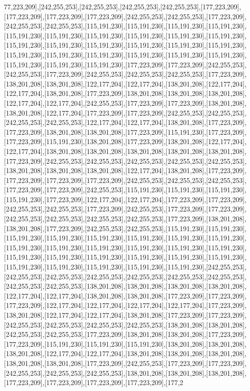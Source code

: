 77,223,209],[242,255,253],[242,255,253],[242,255,253],[242,255,253],[177,223,209],[177,223,209],[177,223,209],[177,223,209],[242,255,253],[242,255,253],[177,223,209],[242,255,253],[242,255,253],[115,191,230],[115,191,230],[115,191,230],[115,191,230],[115,191,230],[115,191,230],[115,191,230],[115,191,230],[115,191,230],[115,191,230],[115,191,230],[115,191,230],[115,191,230],[115,191,230],[115,191,230],[115,191,230],[115,191,230],[115,191,230],[115,191,230],[115,191,230],[115,191,230],[115,191,230],[115,191,230],[115,191,230],[115,191,230],[177,223,209],[177,223,209],[242,255,253],[242,255,253],[177,223,209],[242,255,253],[242,255,253],[242,255,253],[177,223,209],[138,201,208],[138,201,208],[122,177,204],[122,177,204],[138,201,208],[122,177,204],[122,177,204],[138,201,208],[177,223,209],[138,201,208],[138,201,208],[138,201,208],[122,177,204],[122,177,204],[242,255,253],[177,223,209],[177,223,209],[138,201,208],[138,201,208],[122,177,204],[177,223,209],[177,223,209],[242,255,253],[242,255,253],[242,255,253],[242,255,253],[122,177,204],[122,177,204],[138,201,208],[177,223,209],[177,223,209],[138,201,208],[138,201,208],[177,223,209],[115,191,230],[177,223,209],[177,223,209],[115,191,230],[138,201,208],[177,223,209],[138,201,208],[122,177,204],[122,177,204],[138,201,208],[138,201,208],[138,201,208],[138,201,208],[138,201,208],[177,223,209],[242,255,253],[242,255,253],[242,255,253],[242,255,253],[242,255,253],[138,201,208],[138,201,208],[138,201,208],[122,177,204],[138,201,208],[177,223,209],[177,223,209],[177,223,209],[177,223,209],[242,255,253],[242,255,253],[242,255,253],[177,223,209],[177,223,209],[242,255,253],[115,191,230],[115,191,230],[115,191,230],[115,191,230],[177,223,209],[122,177,204],[122,177,204],[177,223,209],[177,223,209],[242,255,253],[242,255,253],[177,223,209],[242,255,253],[177,223,209],[177,223,209],[242,255,253],[242,255,253],[242,255,253],[242,255,253],[177,223,209],[138,201,208],[138,201,208],[177,223,209],[242,255,253],[242,255,253],[115,191,230],[115,191,230],[115,191,230],[115,191,230],[115,191,230],[115,191,230],[115,191,230],[115,191,230],[115,191,230],[115,191,230],[115,191,230],[115,191,230],[115,191,230],[115,191,230],[115,191,230],[115,191,230],[115,191,230],[115,191,230],[115,191,230],[115,191,230],[115,191,230],[115,191,230],[115,191,230],[115,191,230],[115,191,230],[242,255,253],[242,255,253],[242,255,253],[242,255,253],[242,255,253],[242,255,253],[242,255,253],[242,255,253],[242,255,253],[138,201,208],[138,201,208],[138,201,208],[138,201,208],[122,177,204],[122,177,204],[138,201,208],[138,201,208],[177,223,209],[177,223,209],[177,223,209],[122,177,204],[122,177,204],[122,177,204],[122,177,204],[177,223,209],[138,201,208],[122,177,204],[122,177,204],[138,201,208],[177,223,209],[177,223,209],[242,255,253],[242,255,253],[242,255,253],[242,255,253],[138,201,208],[138,201,208],[242,255,253],[242,255,253],[177,223,209],[138,201,208],[138,201,208],[177,223,209],[177,223,209],[115,191,230],[115,191,230],[115,191,230],[138,201,208],[138,201,208],[138,201,208],[122,177,204],[122,177,204],[138,201,208],[138,201,208],[138,201,208],[138,201,208],[138,201,208],[177,223,209],[242,255,253],[177,223,209],[177,223,209],[242,255,253],[242,255,253],[242,255,253],[138,201,208],[138,201,208],[138,201,208],[177,223,209],[177,223,209],[177,223,209],[177,223,209],[177,2